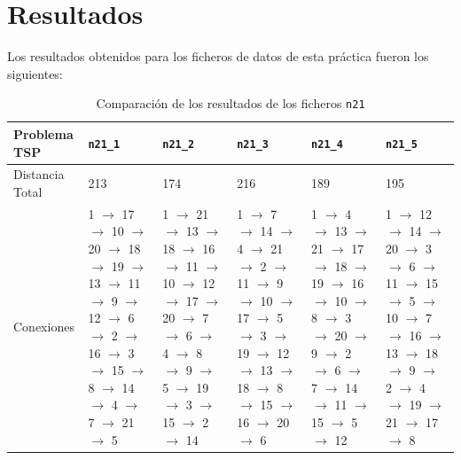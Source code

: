 \documentclass[a4paper,11pt]{article}
\begin{document}
\newpage
\section{Resultados}
Los resultados obtenidos para los ficheros de datos de esta práctica fueron los siguientes:

\begin{table}[!htbp]
\label{results_100}
\centering
\begin{tabularx}{\textwidth}{|p{2cm}|X|X|X|X|X|}
\hline
Problema TSP	& \texttt{n21\_1}	& \texttt{n21\_2}	& \texttt{n21\_3}	& \texttt{n21\_4}	& \texttt{n21\_5} \\ \hline
Distancia Total & 213    & 174    & 216    & 189    & 195   \\ \hline
Conexiones  & 1 $\to$ 17 $\to$ 10 $\to$ 20 $\to$ 18 $\to$ 19 $\to$ 13 $\to$ 11 $\to$ 9 $\to$ 12 $\to$ 6 $\to$ 2 $\to$ 16 $\to$ 3 $\to$ 15 $\to$ 8 $\to$ 14 $\to$ 4 $\to$ 7 $\to$ 21 $\to$ 5	& 1 $\to$ 21 $\to$ 13 $\to$ 18 $\to$ 16 $\to$ 11 $\to$ 10 $\to$ 12 $\to$ 17 $\to$ 20 $\to$ 7 $\to$ 6 $\to$ 4 $\to$ 8 $\to$ 9 $\to$ 5 $\to$ 19 $\to$ 3 $\to$ 15 $\to$ 2 $\to$ 14	& 1 $\to$ 7 $\to$ 14 $\to$ 4 $\to$ 21 $\to$ 2 $\to$ 11 $\to$ 9 $\to$ 10 $\to$ 17 $\to$ 5 $\to$ 3 $\to$ 19 $\to$ 12 $\to$ 13 $\to$ 18 $\to$ 8 $\to$ 15 $\to$ 16 $\to$ 20 $\to$ 6	& 1 $\to$ 4 $\to$ 13 $\to$ 21 $\to$ 17 $\to$ 18 $\to$ 19 $\to$ 16 $\to$ 10 $\to$ 8 $\to$ 3 $\to$ 20 $\to$ 9 $\to$ 2 $\to$ 6 $\to$ 7 $\to$ 14 $\to$ 11 $\to$ 15 $\to$ 5 $\to$ 12	& 1 $\to$ 12 $\to$ 14 $\to$ 20 $\to$ 3 $\to$ 6 $\to$ 11 $\to$ 15 $\to$ 5 $\to$ 10 $\to$ 7 $\to$ 16 $\to$ 13 $\to$ 18 $\to$ 9 $\to$ 2 $\to$ 4 $\to$ 19 $\to$ 21 $\to$ 17 $\to$ 8  \\ \hline
\end{tabularx}
\caption{Comparación de los resultados de los ficheros \texttt{n21}}
\end{table}
\end{document}
